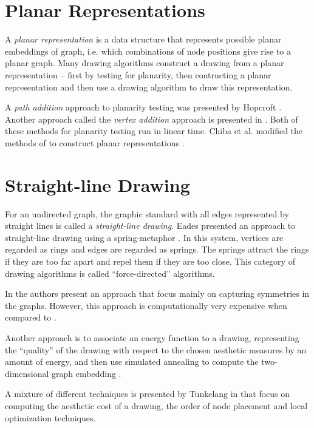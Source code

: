 \section{Planar Representations}

A \emph{planar representation} is a data structure that represents possible
planar embeddings of graph, i.e. which combinations of node positions give
rise to a planar graph. Many drawing algorithms construct a drawing from a
planar representation -- first by testing for planarity, then contructing a
planar representation and then use a drawing algorithm to draw this
representation.

A \emph{path addition} approach to planarity testing was presented by Hopcroft
\cite{Hopcroft1974,Deo1976}. Another approach called the \emph{vertex
addition} approach is presented in \cite{Booth1976}. Both of these methods for
planarity testing run in linear time. Chiba et al. modified the methods of
\cite{Booth1976} to construct planar representations \cite{Chiba1985}.

\section{Straight-line Drawing}

For an undirected graph, the graphic standard with all edges represented by
straight lines is called a \emph{straight-line drawing}. Eades presented an
approach to straight-line drawing using a spring-metaphor
\cite{Eades1984,Fruchterman1991}. In this system, vertices are regarded as
rings and edges are regarded as springs. The springs attract the rings if they
are too far apart and repel them if they are too close. This category of
drawing algorithms is called ``force-directed'' algorithms.

In \cite{Lipton1985} the authors present an approach that focus mainly on
capturing symmetries in the graphs. However, this approach is computationally
very expensive when compared to \cite{Eades1984}.

Another approach is to associate an energy function to a drawing, representing
the ``quality'' of the drawing with respect to the chosen aesthetic measures
by an amount of energy, and then use simulated annealing to compute the
two-dimensional graph embedding \cite{Davidson1996}.

A mixture of different techniques is presented by Tunkelang in
\cite{Tunkelang1992} that focus on computing the aesthetic cost of a drawing,
the order of node placement and local optimization techniques.

